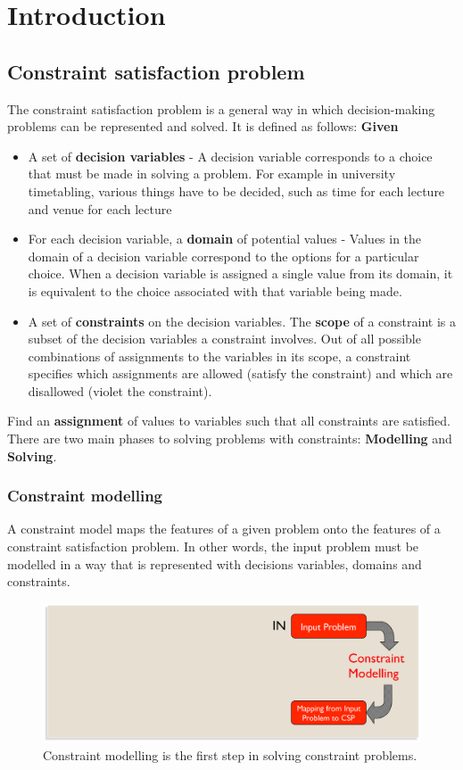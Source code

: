 \documentclass[CS4402-Notes.tex]{subfiles}
\begin{document}
\section{Introduction}

\subsection{Constraint satisfaction problem}
The constraint satisfaction problem is a general way in which decision-making problems can be represented and solved. It is defined as follows:
\textbf{Given}
\begin{itemize}
\item A set of \textbf{decision variables} - A decision variable corresponds to a choice that must be made in solving a problem. For example in university timetabling, various things have to be decided, such as time for each lecture and venue for each lecture
\item For each decision variable, a \textbf{domain} of potential values - Values in the domain of a decision variable correspond to the options for a particular choice. When a decision variable is assigned a single value from its domain, it is equivalent to the choice associated with that variable being made. 
\item A set of \textbf{constraints} on the decision variables. The \textbf{scope} of a constraint is a subset of the decision variables a constraint involves. Out of all possible combinations of assignments to the variables in its scope, a constraint specifies which assignments are allowed (satisfy the constraint) and which are disallowed (violet the constraint). 
\end{itemize}
Find an \textbf{assignment} of values to variables such that all constraints are satisfied.
\n
There are two main phases to solving problems with constraints: \textbf{Modelling} and \textbf{Solving}.
\subsubsection{Constraint modelling}
A constraint model maps the features of a given problem onto the features of a constraint satisfaction problem. In other words, the input problem must be modelled in a way that is represented with decisions variables, domains and constraints. 
\begin{figure}[H]
\centering
\includegraphics[width=1\textwidth, keepaspectratio]{imgs/constraint-modelling.png}
\caption{Constraint modelling is the first step in solving constraint problems.}
\end{figure}
\end{document}
